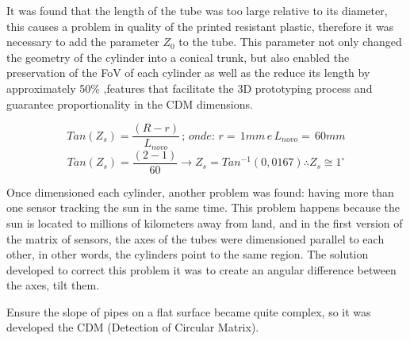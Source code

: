 \documentclass[a4paper,12pt]{article}
\begin{document}
\newpage
It was found that the length of the tube was too large relative to its diameter, this causes a problem in quality of the printed resistant plastic, therefore it was necessary to add the parameter $Z_{0}$ to the tube. This parameter not only changed the geometry of the cylinder into a conical trunk, but also enabled the preservation of the FoV of each cylinder as well as the reduce its length by approximately 50\% ,features that facilitate the 3D prototyping process and guarantee proportionality in the CDM dimensions.
	

$$Tan(Z_{s}) = \frac{(R-r)}{L_{novo}}  \, ; \,  onde: \, r= \,1mm \,e \, L_{novo}= \, 60mm $$
$$Tan(Z_{s}) = \frac{(2-1)}{60}  \longrightarrow   Z_{s} = Tan^{-1}(0,0167) \therefore Z_{s} \cong 1^{\circ} $$

Once dimensioned each cylinder, another problem was found: having more than one sensor tracking the sun in the same time. This problem happens because the sun is located to millions of kilometers away from land, and in the first version of the matrix of sensors, the axes of the tubes were dimensioned parallel to each other, in other words, the cylinders point to the same region. The solution developed to correct this problem it was to create an angular difference between the axes, tilt them.

Ensure the slope of pipes on a flat surface became quite complex, so it was  developed the CDM (Detection of Circular Matrix).
\end{document}
